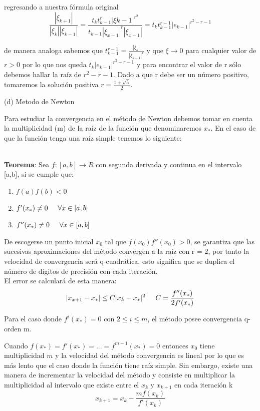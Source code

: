\documentclass[11pt]{article}
\begin{document}
regresando a nuestra fórmula original
$$\frac{|\xi_{k+1}|}{|\xi_{k}||\xi_{k-1}|} = 
\frac{t_k t^r_{k-1} |\xi{k-1}|^{r^2}}{t_{k-1} |\xi_{x-1}|^r |\xi_{x-1}|} = t_k t^{r-1}_{k-1} |e_{k-1}|^{r^2 - r -1}$$

de manera analoga sabemos que $t^{r-1}_{k-1} = \frac{|\xi_{k}|}{|\xi_{k-1}|^r}$ y que $\xi \to 0$ para cualquier valor de $r > 0$ por lo que nos queda $t_k |e_{k-1}|^{r^2 - r -1}$ y para encontrar el valor de r sólo debemos hallar la raíz de $r^2 - r -1$. Dado a que r debe ser un número positivo, tomaremos la solución positiva $r = \frac{1+\sqrt{5}}{2}$.

\vspace{0.5cm}

{\large (d) Ḿetodo de Newton}

Para estudiar la convergencia en el método de Newton debemos tomar en cuenta la multiplicidad (m) de la raíz de la función que denominaremos $x_*$. En el caso de que la función tenga una raíz simple tenemos lo siguiente:

\\\textbf{Teorema}: Sea $f:[a,b]\to R$ con segunda derivada y continua en el intervalo [a,b], si se cumple que:

\begin{enumerate}
\item[\textendash]$f(a)f(b) < 0$
\item[\textendash]$f'(x_*) \neq 0 \hspace{0.5cm} \forall x \in [a,b]$ 
\item[\textendash]$f''(x_*) \neq 0 \hspace{0.5cm} \forall x \in [a,b]$
\end{enumerate}
De escogerse un punto inicial $x_0$ tal que $f(x_0)f''(x_0)>0$, se garantiza que las sucesivas aproximaciones del método convergen a la raíz con r = 2, por tanto la velocidad de convergencia será q-cuadrática, esto significa que se duplica el número de dígitos de precisión con cada iteración.
\\El error se calculará de esta manera:
$$ |x_{x+1}-x_*| \leq C |x_k-x_*|^2  \hspace{0.5cm} 
C = \frac{f''(x_*)}{2f'(x_*)}$$

Para el caso donde $f^i(x_*) = 0$ con $2\leq i \leq m$, el método posee convergencia q-orden m.

Cuando $f(x_*)= f'(x_*) = ... = f^{m-1}(x_*)= 0$ entonces $x_0$ tiene multiplicidad $m$ y la velocidad del método convergencia es lineal por lo que es más lento que el caso donde la función tiene raíz simple. Sin embargo, existe una manera de incrementar la velocidad del método y consiste en multiplicar la multiplicidad al intervalo que existe entre el $x_k$ y $x_{k+1}$ en cada iteración k
$$x_{k+1} = x_k - \frac{mf(x_k)}{f'(x_k)}$$
\vspace{0.5cm}
\end{document}
